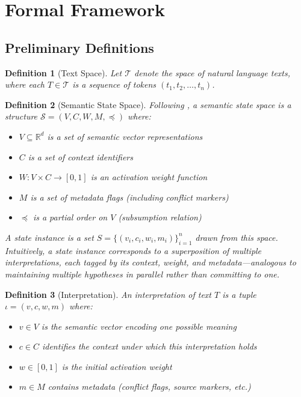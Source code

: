 \documentclass[11pt,a4paper]{article}
\newtheorem{definition}{Definition}
\begin{document}
\section{Formal Framework}
\label{sec:framework}

\subsection{Preliminary Definitions}

\begin{definition}[Text Space]
Let $\mathcal{T}$ denote the space of natural language texts, where each 
$T \in \mathcal{T}$ is a sequence of tokens $(t_1, t_2, \ldots, t_n)$.
\end{definition}

\begin{definition}[Semantic State Space]
Following \cite{saito2025nrr}, a \textit{semantic state space} is a structure 
$\mathcal{S} = (V, C, W, M, \preceq)$ where:
\begin{itemize}
    \item $V \subseteq \mathbb{R}^d$ is a set of semantic vector representations
    \item $C$ is a set of context identifiers
    \item $W: V \times C \to [0,1]$ is an activation weight function
    \item $M$ is a set of metadata flags (including conflict markers)
    \item $\preceq$ is a partial order on $V$ (subsumption relation)
\end{itemize}
A state instance is a set $S = \{(v_i, c_i, w_i, m_i)\}_{i=1}^{n}$ drawn from this space.
Intuitively, a state instance corresponds to a \textit{superposition} of multiple 
interpretations, each tagged by its context, weight, and metadata---analogous to 
maintaining multiple hypotheses in parallel rather than committing to one.
\end{definition}

\begin{definition}[Interpretation]
An \textit{interpretation} of text $T$ is a tuple $\iota = (v, c, w, m)$ where:
\begin{itemize}
    \item $v \in V$ is the semantic vector encoding one possible meaning
    \item $c \in C$ identifies the context under which this interpretation holds
    \item $w \in [0,1]$ is the initial activation weight
    \item $m \in M$ contains metadata (conflict flags, source markers, etc.)
\end{itemize}
\end{definition}
\end{document}
